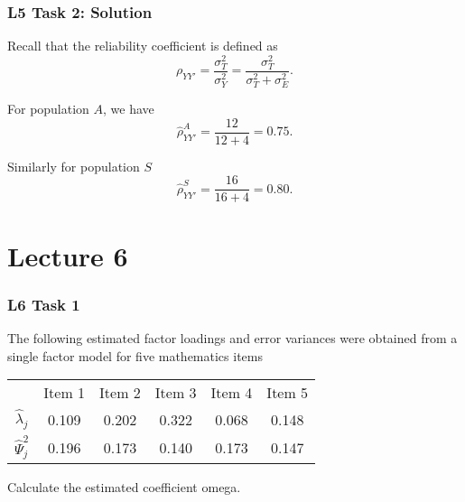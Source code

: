 \documentclass[compress]{beamer}\usepackage[]{graphicx}\usepackage[]{xcolor}
\begin{document}
\begin{frame}[fragile]
  \frametitle{L5 Task 2: Solution}
    Recall that the reliability coefficient is defined as
      \[ \rho_{YY'} = \frac{\sigma_T^2}{\sigma_Y^2} = \frac{\sigma_T^2}{\sigma_T^2 + \sigma_E^2}. \]

    For population $A$, we have
      \[ \hat{\rho}_{YY'}^A = \frac{12}{12 + 4} = 0.75. \]

    Similarly for population $S$
    \[ \hat{\rho}_{YY'}^S = \frac{16}{16 + 4} = 0.80. \]
\end{frame}


\section{Lecture 6}

\begin{frame}[fragile]
  \frametitle{L6 Task 1}
    The following estimated factor loadings and error variances were obtained from a single factor model for five mathematics items

    \begin{center}
      \begin{tabular}{cccccc}
        \hline
          &Item 1 &Item 2 &Item 3 &Item 4 &Item 5 \\
          $\hat{\lambda}_j$ &0.109 &0.202 &0.322 &0.068 &0.148 \\
          $\hat{\Psi}_j^2$ &0.196 &0.173 &0.140 &0.173 &0.147 \\
        \hline
      \end{tabular}
    \end{center}

    Calculate the estimated coefficient omega.
\end{frame}
\end{document}
